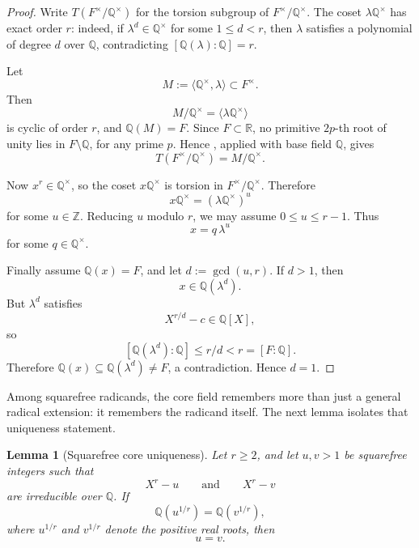 \documentclass[11pt,letterpaper]{amsart}
\newcommand{\Q}{\mathbb{Q}}
\newcommand{\Z}{\mathbb{Z}}
\newcommand{\R}{\mathbb{R}}
\theoremstyle{plain}
\newtheorem{lemma}[theorem]{Lemma}
\theoremstyle{definition}
\begin{document}
\begin{proof}
Write \(T(F^\times/\Q^\times)\) for the torsion subgroup of
\(F^\times/\Q^\times\).  The coset \(\lambda\Q^\times\) has exact order \(r\):
indeed, if \(\lambda^d\in\Q^\times\) for some \(1\le d<r\), then \(\lambda\)
satisfies a polynomial of degree \(d\) over \(\Q\), contradicting
\([\Q(\lambda):\Q]=r\).

Let
\[
M:=\langle \Q^\times,\lambda\rangle\subset F^\times.
\]
Then
\[
M/\Q^\times=\langle \lambda\Q^\times\rangle
\]
is cyclic of order \(r\), and \(\Q(M)=F\).  Since \(F\subset \R\), no primitive
\(2p\)-th root of unity lies in \(F\setminus \Q\), for any prime \(p\).  Hence
\cite[Theorem~1.7]{GayVelez1981}, applied with base field \(\Q\), gives
\[
T(F^\times/\Q^\times)=M/\Q^\times.
\]

Now \(x^r\in\Q^\times\), so the coset \(x\Q^\times\) is torsion in
\(F^\times/\Q^\times\).  Therefore
\[
x\Q^\times=(\lambda\Q^\times)^u
\]
for some \(u\in\Z\).  Reducing \(u\) modulo \(r\), we may assume
\(0\le u\le r-1\).  Thus
\[
x=q\,\lambda^u
\]
for some \(q\in\Q^\times\).

Finally assume \(\Q(x)=F\), and let \(d:=\gcd(u,r)\).  If \(d>1\), then
\[
x\in \Q(\lambda^d).
\]
But \(\lambda^d\) satisfies
\[
X^{r/d}-c\in \Q[X],
\]
so
\[
[\Q(\lambda^d):\Q]\le r/d<r=[F:\Q].
\]
Therefore \(\Q(x)\subseteq \Q(\lambda^d)\neq F\), a contradiction.  Hence
\(d=1\).
\end{proof}

Among squarefree radicands, the core field remembers more than just a general radical extension: it remembers the radicand itself. The next lemma isolates that uniqueness statement.


\begin{lemma}[Squarefree core uniqueness]
\label{lem:squarefree-core-uniqueness}
Let \(r\ge 2\), and let \(u,v>1\) be squarefree integers such that
\[
X^r-u
\qquad\text{and}\qquad
X^r-v
\]
are irreducible over \(\Q\).  If
\[
\Q(u^{1/r})=\Q(v^{1/r}),
\]
where \(u^{1/r}\) and \(v^{1/r}\) denote the positive real roots, then
\[
u=v.
\]
\end{lemma}
\end{document}
